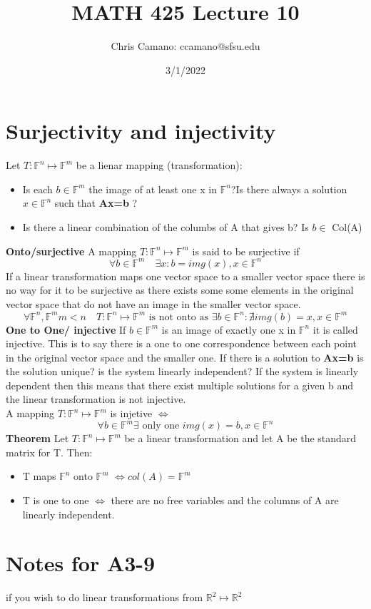 \documentclass[12pt]{article}
\author{Chris Camano: ccamano@sfsu.edu}
\title{MATH 425  Lecture 10 }
\date{3/1/2022}
\newcommand{\sect}[1]{\section*{#1}}
\newcommand{\R}{\mathbb{R}}
\newcommand{\F}{\mathbb{F}}
\newcommand{\Axb}{\textbf{Ax=b} }
\begin{document}
\maketitle
\sect{Surjectivity and injectivity}
Let $T:\F^n \mapsto \F^m$ be a lienar mapping (transformation):
\begin{itemize}
  \item Is each $b \in \F^m$ the image of at least one x in $\F^n$?Is there always a solution $x \in \F^n$ such that \Axb?
  \item Is there a linear combination of the columbs of A that gives b? Is $ b\in$ Col(A)
\end{itemize}
\textbf{Onto/surjective} A mapping $T:\F^n \mapsto \F^m$ is said to be surjective if \[
  \forall b \in \F^m\quad  \exists x :  b=img(x), x\in \F^n
\]
If a linear transformation maps one vector space to a smaller vector space there is no way for it to be surjective as there exists some some elements in the original vector space that do not have an image in the smaller vector space.
\[
  \forall \F^n,\F^m m<n \quad T:\F^n \mapsto \F^m \text{ is not onto as } \exists b \in \F^n : \nexists img(b)=x, x \in \F^m
\]
\textbf{One to One/ injective}
If $ b\in \F^m$ is an image of exactly one x in $\F^n$ it is called injective. This is to say there is a one to one correspondence between each point in the original vector space and the smaller one. If there is a solution to \Axb is the solution unique? is the system linearly independent? If the system is linearly dependent then this means that there exist multiple solutions for a given b and the linear transformation is not injective. \\
A mapping $T:\F^n \mapsto \F^m$ is injetive $\iff$
\[
   \forall b \in \F^m \exists \text{ only one } img(x)=b, x\in \F^n
\]
\textbf{Theorem} Let $T:\F^n \mapsto \F^m$ be a linear transformation and let A be the standard matrix for T. Then:
\begin{itemize}
  \item T maps $\F^n$ onto $\F^m$ $\iff col(A)=\F^m$
  \item T is one to one $\iff$ there are no free variables and the columns of A are linearly independent.
\end{itemize}
\sect{Notes for A3-9}
if you wish to do linear transformations from $\R^2\mapsto \R^2$
\end{document}
